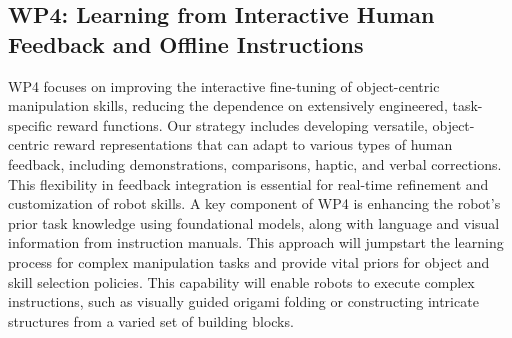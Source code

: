 \documentclass{erc-B2}
\begin{document}
\subsection{WP4: Learning from Interactive Human Feedback and Offline Instructions}
WP4 focuses on improving the interactive fine-tuning of object-centric manipulation skills, reducing the dependence on extensively engineered, task-specific reward functions. Our strategy includes developing versatile, object-centric reward representations that can adapt to various types of human feedback, including demonstrations, comparisons, haptic, and verbal corrections. This flexibility in feedback integration is essential for real-time refinement and customization of robot skills.
A key component of WP4 is enhancing the robot's prior task knowledge using foundational models, along with language and visual information from instruction manuals. This approach will jumpstart the learning process for complex manipulation tasks and provide vital priors for object and skill selection policies. This capability will enable robots to execute complex instructions, such as visually guided origami folding or constructing intricate structures from a varied set of building blocks.
\end{document}
